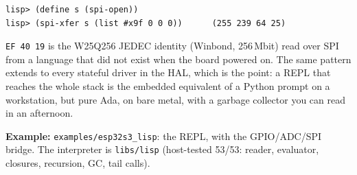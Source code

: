 \begin{lstlisting}[style=sh]
lisp> (define s (spi-open))
lisp> (spi-xfer s (list #x9f 0 0 0))      (255 239 64 25)
\end{lstlisting}

\texttt{EF 40 19} is the W25Q256 JEDEC identity (Winbond, 256\,Mbit) read over SPI
from a language that did not exist when the board powered on. The same pattern
extends to every stateful driver in the HAL, which is the point: a REPL that reaches
the whole stack is the embedded equivalent of a Python prompt on a workstation, but
pure Ada, on bare metal, with a garbage collector you can read in an afternoon.

\noindent\textbf{Example:} \texttt{examples/esp32s3\_lisp}: the REPL, with the
GPIO/ADC/SPI bridge. The interpreter is \texttt{libs/lisp} (host-tested 53/53:
reader, evaluator, closures, recursion, GC, tail calls).
